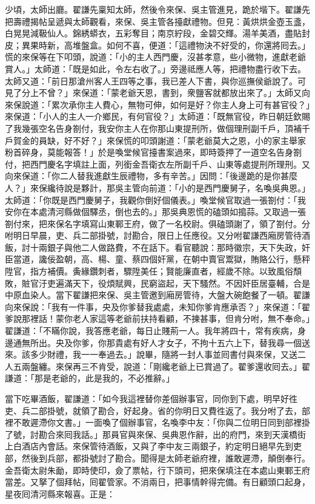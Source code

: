 少頃，太師出廳。翟謙先稟知太師，然後令來保、吳主管進見，跪於堦下。翟謙先把壽禮揭帖呈遞與太師觀看，來保、吳主管各擡獻禮物。但見：黃烘烘金壺玉盞，白晃晃減靸仙人。錦綉蟒衣，五彩奪目；南京紵段，金碧交輝。湯羊美酒，盡貼封皮；異果時新，高堆盤盒。{}如何不喜，便道：「這禮物決不好受的，你還將囘去。」慌的來保等在下叩頭，說道：「小的主人西門慶，沒甚孝意，些小微物，進獻老爺賞人。」太師道：「既是如此，令左右收了。」旁邊祗應人等，把禮物盡行收下去。太師又道：「前日那滄州客人王四等之事，我已差人下書，與你巡撫侯爺說了。可見了分上不曾？」{}來保道：「蒙老爺天恩，書到，衆鹽客就都放出來了。」太師又向來保說道：「累次承你主人費心，無物可伸，如何是好？你主人身上可有甚官役？」來保道：「小人的主人一介鄉民，有何官役？」太師道：「既無官役，昨日朝廷欽賜了我幾張空名告身劄付，我安你主人在你那山東提刑所，做個理刑副千戶，頂補千戶賀金的員缺，好不好？」來保慌的叩頭謝道：「蒙老爺莫大之恩，小的家主舉家粉首碎身，莫能報答！」於是喚堂候官擡書案過來，即時簽押了一道空名告身劄付，把西門慶名字填註上面，列銜金吾衛衣左所副千戶、山東等處提刑所理刑。又向來保道：「你二人替我進獻生辰禮物，多有辛苦。」因問：「後邊跪的是你甚麼人？」來保纔待說是夥計，那吳主管向前道：「小的是西門慶舅子，名喚吳典恩。」{}太師道：「你既是西門慶舅子，我觀你倒好個儀表。」喚堂候官取過一張劄付：「我安你在本處清河縣做個驛丞，倒也去的。」那吳典恩慌的磕頭如搗蒜。又取過一張劄付來，把來保名字填寫山東鄆王府，做了一名校尉。俱磕頭謝了，領了劄付。分咐明日早晨，吏、兵二部掛號，討勘合，限日上任應役。又分咐翟謙西廂房管待酒飯，討十兩銀子與他二人做路費，不在話下。看官聽說：那時徽宗，天下失政，奸臣當道，讒佞盈朝，高、楊、童、蔡四個奸黨，在朝中賣官鬻獄，賄賂公行，懸秤陞官，指方補價。夤緣鑽刺者，驟陞美任；賢能廉直者，經歲不除。以致風俗頹敗，賍官汙吏遍滿天下，役煩賦興，民窮盜起，天下騷然。不因奸臣居臺輔，合是中原血染人。當下翟謙把來保、吳主管邀到廂房管待，大盤大碗飽餐了一頓。翟謙向來保說：「我有一件事，央及你爹替我處處，未知你爹肯應承否？」來保道：「翟爹說那裡話！蒙你老人家這等老爺前扶持看顧，不揀甚事，但肯分咐，無不奉命。」翟謙道：「不瞞你說，我答應老爺，每日止賤荊一人。我年將四十，常有疾病，身邊通無所出。央及你爹，你那貴處有好人才女子，不拘十五六上下，替我尋一個送來。該多少財禮，我一一奉過去。」{}說畢，隨將一封人事並囘書付與來保，又送二人五兩盤纏。來保再三不肯受，說道：「剛纔老爺上已賞過了。翟爹還收囘去。」翟謙道：「那是老爺的，此是我的，不必推辭。」

當下吃畢酒飯，翟謙道：「如今我這裡替你差個辦事官，同你到下處，明早好徃吏、兵二部掛號，就領了勘合，好起身。省的你明日又費徃返了。我分咐了去，部裡不敢遲滯你文書。」一面喚了個辦事官，名喚李中友：「你與二位明日同到部裡掛了號，討勘合來囘我話。」那員官與來保、吳典恩作辭，出的府門，來到天漢橋街上白酒店內會話。來保管待酒飯，又與了李中友三兩銀子，約定明日絕早先到吏部，然後到兵部，都掛號討了勘合。聞得是太師老爺府裡，誰敢遲滯，顛倒奉行。金吾衛太尉朱勔，即時使印，僉了票帖，行下頭司，把來保填注在本處山東鄆王府當差。又拏了個拜帖，囘翟管家。{}不消兩日，把事情幹得完備。有日顧頭口起身，星夜囘清河縣來報喜。正是：

